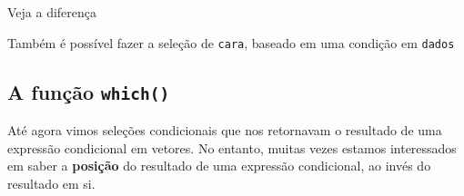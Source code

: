 \documentclass[10pt,a4paper]{book}
\newenvironment{Shaded}{\begin{snugshade}}{\end{snugshade}}
\newcommand{\KeywordTok}[1]{\textcolor[rgb]{0.13,0.29,0.53}{\textbf{#1}}}
\newcommand{\DecValTok}[1]{\textcolor[rgb]{0.00,0.00,0.81}{#1}}
\newcommand{\StringTok}[1]{\textcolor[rgb]{0.31,0.60,0.02}{#1}}
\newcommand{\OtherTok}[1]{\textcolor[rgb]{0.56,0.35,0.01}{#1}}
\newcommand{\OperatorTok}[1]{\textcolor[rgb]{0.81,0.36,0.00}{\textbf{#1}}}
\newcommand{\NormalTok}[1]{#1}
\begin{document}
Veja a diferença

\begin{Shaded}
\end{Shaded}

Também é possível fazer a seleção de \texttt{cara}, baseado em uma
condição em \texttt{dados}

\begin{Shaded}
\end{Shaded}

\subsection{\texorpdfstring{A função
\texttt{which()}}{A função which()}}\label{a-funuxe7uxe3o-which}

Até agora vimos seleções condicionais que nos retornavam o resultado de
uma expressão condicional em vetores. No entanto, muitas vezes estamos
interessados em saber a \textbf{posição} do resultado de uma expressão
condicional, ao invés do resultado em si.
\end{document}
